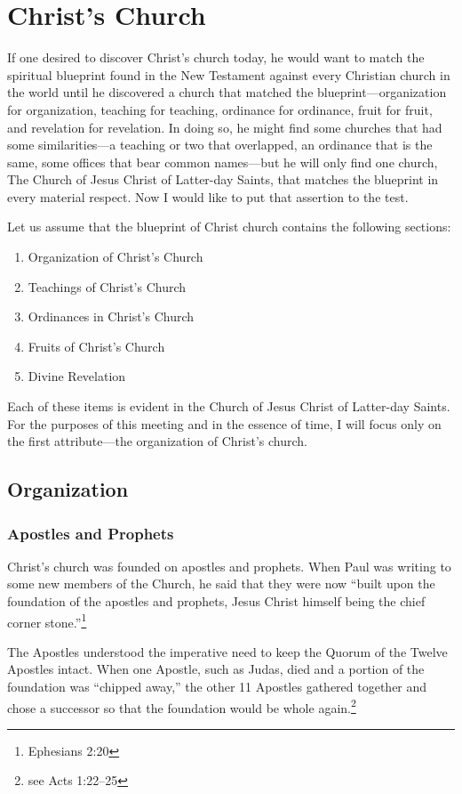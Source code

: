 \documentclass{article}
\begin{document}
\section*{Christ's Church}
If one desired to discover Christ's church today, he would want to match the spiritual blueprint found in the New Testament against every Christian church in the world until he discovered a church that matched the blueprint---organization for organization, teaching for teaching, ordinance for ordinance, fruit for fruit, and revelation for revelation. In doing so, he might find some churches that had some similarities---a teaching or two that overlapped, an ordinance that is the same, some offices that bear common names---but he will only find one church, The Church of Jesus Christ of Latter-day Saints, that matches the blueprint in every material respect. Now I would like to put that assertion to the test.

Let us assume that the blueprint of Christ church contains the following sections:
\begin{enumerate}
\item Organization of Christ's Church
\item Teachings of Christ's Church
\item Ordinances in Christ's Church
\item Fruits of Christ's Church
\item Divine Revelation
\end{enumerate}

Each of these items is evident in the Church of Jesus Christ of Latter-day Saints. For the purposes of this meeting and in the essence of time, I will focus only on the first attribute---the organization of Christ's church.

\subsection*{Organization}

\subsubsection*{Apostles and Prophets}
Christ's church was founded on apostles and prophets. When Paul was writing to some new members of the Church, he said that they were now ``built upon the foundation of the apostles and prophets, Jesus Christ himself being the chief corner stone.''\footnote{Ephesians 2:20}

The Apostles understood the imperative need to keep the Quorum of the Twelve Apostles intact. When one Apostle, such as Judas, died and a portion of the foundation was ``chipped away,'' the other 11 Apostles gathered together and chose a successor so that the foundation would be whole again.\footnote{see Acts 1:22--25}
\end{document}
